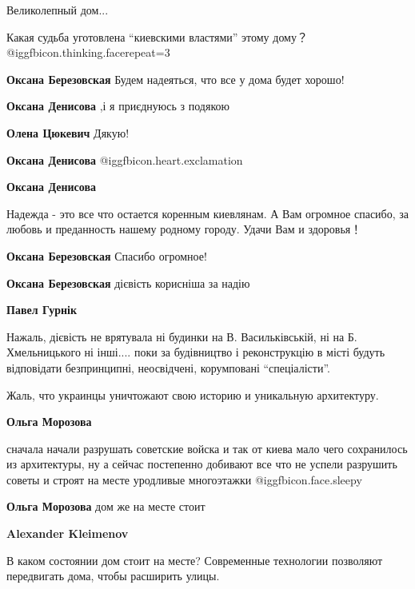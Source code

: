 \begin{itemize}
Великолепный дом...

Какая судьба уготовлена \enquote{киевскими властями} этому дому？
@igg{fbicon.thinking.face}{repeat=3} 

\begin{itemize} %
\textbf{Оксана Березовская} Будем надеяться, что все у дома будет хорошо!

\textbf{Оксана Денисова} ,і я приєднуюсь з подякою

\textbf{Олена Цюкевич} Дякую!

\textbf{Оксана Денисова} @igg{fbicon.heart.exclamation}

\textbf{Оксана Денисова} 

Надежда - это все что остается коренным киевлянам. А Вам огромное спасибо, за
любовь и преданность нашему родному городу. Удачи Вам и здоровья！


\textbf{Оксана Березовская} Спасибо огромное!

\textbf{Оксана Березовская} дієвість корисніша за надію

\textbf{Павел Гурнік} 

Нажаль, дієвість не врятувала ні будинки на В. Васильківській, ні на
Б. Хмельницького ні інші.... поки за будівництво і реконструкцію в місті будуть
відповідати безпринципні, неосвідчені, корумповані \enquote{спеціалісти}.

\end{itemize} %

Жаль, что украинцы уничтожают свою историю и уникальную архитектуру.

\begin{itemize} %
\textbf{Ольга Морозова} 

сначала начали разрушать советские войска и так от киева мало чего сохранилось
из архитектуры, ну а сейчас постепенно добивают все что не успели разрушить
советы и строят на месте уродливые многоэтажки @igg{fbicon.face.sleepy} 

\textbf{Ольга Морозова} дом же на месте стоит

\begin{itemize} %
\textbf{Alexander Kleimenov} 

В каком состоянии дом стоит на месте? Современные технологии позволяют
передвигать дома, чтобы расширить улицы.



\end{itemize}
\end{itemize}
\end{itemize}
